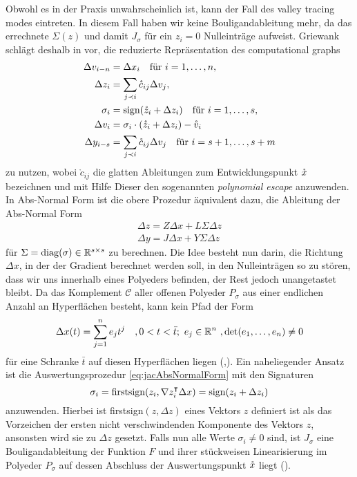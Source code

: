 Obwohl es in der Praxis unwahrscheinlich ist, kann der Fall des valley tracing modes eintreten.
In diesem Fall haben wir keine Bouligandableitung mehr, da das errechnete $\Sigma(z)$ und damit $J_\sigma$ für ein $z_i=0$ Nulleinträge aufweist. Griewank schlägt deshalb in \cite[S.29]{monster} vor, die reduzierte Repräsentation des computational graphs 
\begin{equation}
 \begin{aligned}
  \Delta v_{i-n} &= \Delta x_i \quad \text{für } i=1,\ldots,n, \\
  \Delta z_i &= \sum_{j\prec i} \mathring c_{ij}\Delta v_j,\\
  \sigma_i& = \text{sign}(\mathring z_i + \Delta z_i) \quad \text{für } i=1,\ldots,s,\\
  \Delta v_i &= \sigma_i \cdot (\mathring z_i+\Delta z_i) - \mathring{v}_i\\
  \Delta y_{i-s}& = \sum_{j\prec i} \mathring c_{ij} \Delta v_j \quad \text{für } i=s+1, \ldots, s+m
 \end{aligned}
 \label{eq:minComputationalGraphRepr}
\end{equation}
zu nutzen, wobei $\mathring c_{ij}$ die glatten Ableitungen zum Entwicklungspunkt $\mathring{x}$ bezeichnen und mit Hilfe Dieser den sogenannten \textit{polynomial escape} anzuwenden. In Abs-Normal Form ist die obere Prozedur äquivalent dazu, die Ableitung der Abs-Normal Form 
\begin{equation}
\begin{aligned}
  \Delta z = Z\Delta x + L\Sigma \Delta z \\
 \Delta y = J\Delta x + Y\Sigma \Delta z  
\end{aligned}
\label{eq:jacAbsNormalForm}
\end{equation}
für $\Sigma = \operatorname{diag}(\sigma) \in \mathbb{R}^{s\times s}$ zu berechnen. Die Idee besteht nun darin, die Richtung $\Delta x$, in der der Gradient berechnet werden soll, in den Nulleinträgen so zu stören, dass wir uns innerhalb eines Polyeders befinden, der Rest jedoch unangetastet bleibt. Da das Komplement $\mathcal C$ aller offenen Polyeder $P_\sigma$ aus einer endlichen Anzahl an Hyperflächen besteht, kann kein Pfad der Form
\begin{equation}
 \Delta x(t) = \sum_{j=1}^n e_j t^j \quad ,0<t<\bar t;~e_j\in \mathbb{R}^n ~,\det(e_1,\ldots,e_n)\neq 0
\end{equation}
für eine Schranke $\bar t$ auf diesen Hyperflächen liegen (\cite[Proposition 6]{monster},\cite[S.11]{plan}). 
Ein naheliegender Ansatz ist die Auswertungsprozedur \eqref{eq:jacAbsNormalForm} mit den Signaturen
\[
 \sigma_i = \text{firstsign}(z_i,\nabla z_i^\intercal\Delta x) = \text{sign}(z_i+\Delta z_i)
\]
anzuwenden. Hierbei ist firstsign$(z,\Delta z)$ eines Vektors $z$ definiert ist als das Vorzeichen der ersten nicht verschwindenden Komponente des Vektors $z$, ansonsten wird sie zu $\Delta z$ gesetzt. Falls nun alle Werte $\sigma_i \neq 0$ sind, ist $J_\sigma$ eine Bouligandableitung der Funktion $F$ und ihrer stückweisen Linearisierung im Polyeder $P_\sigma$ auf dessen Abschluss der Auswertungspunkt $\mathring{x}$ liegt (\cite[S.]{monster}).

